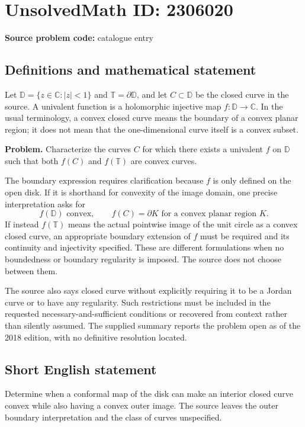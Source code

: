 \documentclass[11pt]{article}
\begin{document}
\section*{UnsolvedMath ID: 2306020}
\textbf{Source problem code:} catalogue entry
\subsection{Definitions and mathematical statement}
Let $\mathbb D=\{z\in\mathbb C:|z|<1\}$ and $\mathbb T=\partial\mathbb D$, and let $C\subset\mathbb D$ be the closed curve in the source. A univalent function is a holomorphic injective map $f:\mathbb D\to\mathbb C$. In the usual terminology, a convex closed curve means the boundary of a convex planar region; it does not mean that the one-dimensional curve itself is a convex subset.

\textbf{Problem.} Characterize the curves $C$ for which there exists a univalent $f$ on $\mathbb D$ such that both $f(C)$ and $f(\mathbb T)$ are convex curves.

The boundary expression requires clarification because $f$ is only defined on the open disk. If it is shorthand for convexity of the image domain, one precise interpretation asks for
\[
f(\mathbb D)\text{ convex},\qquad
f(C)=\partial K\text{ for a convex planar region }K.
\]
If instead $f(\mathbb T)$ means the actual pointwise image of the unit circle as a convex closed curve, an appropriate boundary extension of $f$ must be required and its continuity and injectivity specified. These are different formulations when no boundedness or boundary regularity is imposed. The source does not choose between them.

The source also says closed curve without explicitly requiring it to be a Jordan curve or to have any regularity. Such restrictions must be included in the requested necessary-and-sufficient conditions or recovered from context rather than silently assumed. The supplied summary reports the problem open as of the 2018 edition, with no definitive resolution located.
\subsection{Short English statement}
Determine when a conformal map of the disk can make an interior closed curve convex while also having a convex outer image. The source leaves the outer boundary interpretation and the class of curves unspecified.
\end{document}
